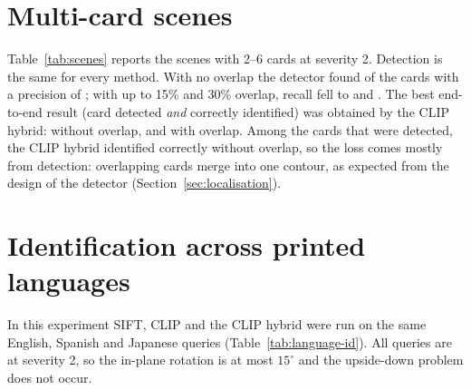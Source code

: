 

\section{Multi-card scenes}
\label{sec:res-scenes}

Table~\ref{tab:scenes} reports the scenes with 2--6 cards at severity 2. Detection is the same for every method. With no overlap the detector found  of the cards with a precision of ; with up to 15\% and 30\% overlap, recall fell to  and . The best end-to-end result (card detected \emph{and} correctly identified) was obtained by the CLIP hybrid:  without overlap,  and  with overlap. Among the cards that were detected, the CLIP hybrid identified  correctly without overlap, so the loss comes mostly from detection: overlapping cards merge into one contour, as expected from the design of the detector (Section~\ref{sec:localisation}).



\section{Identification across printed languages}
\label{sec:res-language-id}

In this experiment SIFT, CLIP and the CLIP hybrid were run on the same English, Spanish and Japanese queries (Table~\ref{tab:language-id}). All queries are at severity 2, so the in-plane rotation is at most $15^\circ$ and the upside-down problem does not occur.



